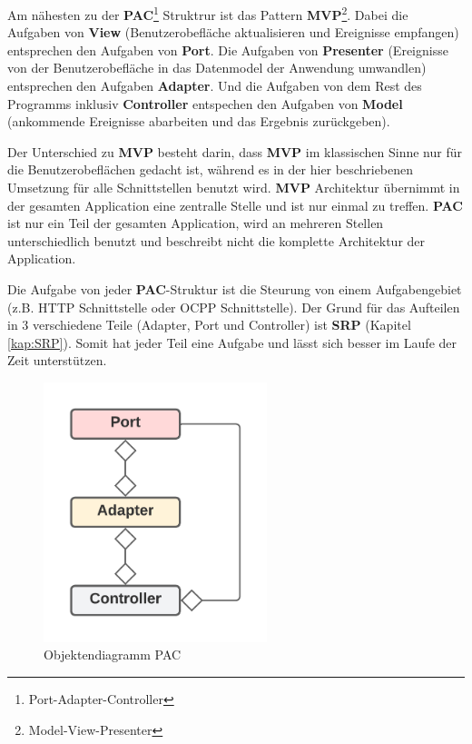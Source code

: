 Am nähesten zu der \textbf{PAC}\footnote{Port-Adapter-Controller} Struktrur 
ist das Pattern \textbf{MVP}\footnote{Model-View-Presenter}.
Dabei die Aufgaben von \textbf{View} (Benutzerobefläche aktualisieren und Ereignisse empfangen) entsprechen den Aufgaben von \textbf{Port}. 
Die Aufgaben von \textbf{Presenter} (Ereignisse von der Benutzerobefläche in das Datenmodel der Anwendung umwandlen) entsprechen den Aufgaben \textbf{Adapter}.
Und die Aufgaben von dem Rest des Programms inklusiv \textbf{Controller} entspechen den Aufgaben von \textbf{Model} (ankommende Ereignisse abarbeiten und das Ergebnis zurückgeben).

Der Unterschied zu \textbf{MVP} besteht darin, dass \textbf{MVP} im klassischen Sinne nur für die Benutzerobeflächen gedacht ist,
während es in der hier beschriebenen Umsetzung für alle Schnittstellen benutzt wird.
\textbf{MVP} Architektur übernimmt in der gesamten Application eine zentralle Stelle und ist nur einmal zu treffen.
\textbf{PAC} ist nur ein Teil der gesamten Application, wird an mehreren Stellen unterschiedlich benutzt und beschreibt nicht 
die komplette Architektur der Application.

Die Aufgabe von jeder \textbf{PAC}-Struktur ist die Steurung von einem Aufgabengebiet (z.B. HTTP Schnittstelle oder OCPP Schnittstelle).
Der Grund für das Aufteilen in 3 verschiedene Teile (Adapter, Port und Controller) ist
\textbf{SRP} (Kapitel \ref{kap:SRP}). Somit hat jeder Teil eine Aufgabe und lässt sich besser im Laufe der Zeit
unterstützen. 


\begin{figure}[H]
   \centering
   \includegraphics[width=6.5cm]{./images/Port-Adapter-Contoller.png}
    \caption[Objektendiagramm PAC]{Objektendiagramm PAC}
    \label{fig:CDPAC}
\end{figure}